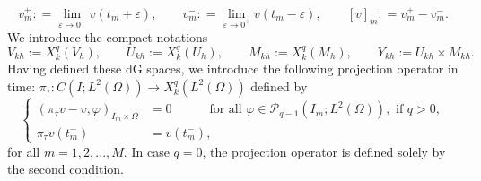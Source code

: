 \documentclass{m2an}
\newcommand{\ImOprod}[1]{\left( #1 \right)_{I_m\times\Omega}}
\newcommand{\Ukh}{U_{kh}}
\newcommand{\Vkh}{V_{kh}}
\newcommand{\Mkh}{M_{kh}}
\newcommand{\Xkh}{Y_{kh}}
\begin{document}
\begin{equation*}
  v_m^+ : = \lim_{\varepsilon \to 0^+} v(t_m + \varepsilon), \qquad
  v_m^- : = \lim_{\varepsilon \to 0^+} v(t_m - \varepsilon), \qquad
  [v]_m : = v_m^+ - v_m^-.
\end{equation*}
We introduce the compact notations
\begin{equation*}
  \Vkh := X^q_k(V_h), \qquad
  \Ukh := X^q_k(U_h), \qquad
  \Mkh := X^q_k(M_h), \qquad
  \Xkh := \Ukh \times \Mkh.
\end{equation*}
Having defined these dG spaces, we introduce the following projection operator in time:
$\pi_\tau\colon C(I;L^2(\Omega)) \to X^q_k(L^2(\Omega))$ defined by
\begin{equation}\label{eq:dg_time_projection}
  \left\{
\begin{aligned}
  \ImOprod{\pi_\tau v - v,\varphi} &= 0 \qquad \quad \text{for all } \varphi \in \mathcal P_{q-1}(I_m;L^2(\Omega)), 
  \text{ if } q>0,\\
  \pi_\tau v(t_m^-) &= v(t_m^-),
\end{aligned}
 \right.
 \end{equation}
for all $m=1,2,...,M$. In case $q=0$, the projection operator is defined solely by the second condition.
\end{document}
